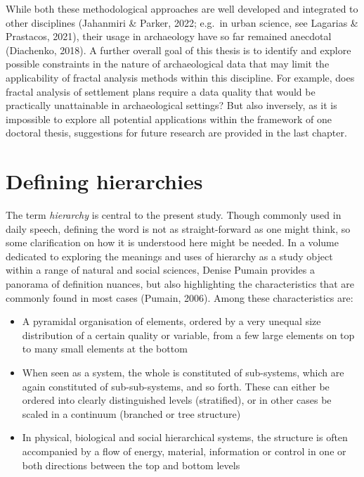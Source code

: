 \documentclass[
  12pt,
]{book}
\begin{document}
While both these methodological approaches are well developed and integrated to other disciplines (Jahanmiri \& Parker, 2022; e.g.~in urban science, see Lagarias \& Prastacos, 2021), their usage in archaeology have so far remained anecdotal (Diachenko, 2018). A further overall goal of this thesis is to identify and explore possible constraints in the nature of archaeological data that may limit the applicability of fractal analysis methods within this discipline. For example, does fractal analysis of settlement plans require a data quality that would be practically unattainable in archaeological settings? But also inversely, as it is impossible to explore all potential applications within the framework of one doctoral thesis, suggestions for future research are provided in the last chapter.

\hypertarget{defining-hierarchies}{%
\section{Defining hierarchies}\label{defining-hierarchies}}

The term \emph{hierarchy} is central to the present study. Though commonly used in daily speech, defining the word is not as straight-forward as one might think, so some clarification on how it is understood here might be needed. In a volume dedicated to exploring the meanings and uses of hierarchy as a study object within a range of natural and social sciences, Denise Pumain provides a panorama of definition nuances, but also highlighting the characteristics that are commonly found in most cases (Pumain, 2006). Among these characteristics are:

\begin{itemize}
\item
  A pyramidal organisation of elements, ordered by a very unequal size distribution of a certain quality or variable, from a few large elements on top to many small elements at the bottom
\item
  When seen as a system, the whole is constituted of sub-systems, which are again constituted of sub-sub-systems, and so forth. These can either be ordered into clearly distinguished levels (stratified), or in other cases be scaled in a continuum (branched or tree structure)
\item
  In physical, biological and social hierarchical systems, the structure is often accompanied by a flow of energy, material, information or control in one or both directions between the top and bottom levels
\end{itemize}
\end{document}
